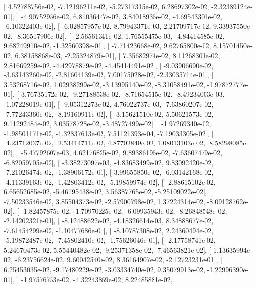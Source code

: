 \documentclass{article}
\begin{document}
       [  4.52788756e-02,  -7.12196211e-02,  -5.27317315e-02,
          6.28697302e-02,  -2.32389124e-01],
       [ -4.90752956e-02,   6.81036447e-02,   3.84018935e-02,
         -4.69543301e-02,  -6.10322403e-02],
       [ -6.02857957e-02,   8.79943371e-03,   2.21709717e-02,
          9.33937550e-02,  -8.36517906e-02],
       [ -2.56561341e-02,   1.76555475e-03,  -4.84414585e-02,
          9.68249910e-02,  -1.32560398e-01],
       [ -7.71423668e-02,   9.62765800e-02,   8.15701450e-02,
          6.38158868e-03,  -2.25324879e-01],
       [  7.35682974e-02,   8.11268301e-02,   2.81669259e-02,
         -4.42978879e-02,  -4.45414491e-02],
       [ -9.03906690e-02,  -3.63143260e-02,  -2.81604139e-02,
          7.00175028e-02,  -2.33035714e-01],
       [  3.53268716e-02,   1.02938299e-02,  -3.13995140e-02,
         -8.31058491e-02,  -1.97872777e-01],
       [  3.76735172e-02,  -9.27188538e-02,  -8.71654515e-02,
         -8.49234003e-03,  -1.07228019e-01],
       [ -9.05312273e-02,   4.76022737e-03,  -7.63860207e-02,
         -7.77243360e-02,  -8.19160911e-02],
       [ -3.15621510e-02,   5.50621573e-02,   9.11292484e-02,
          3.03578728e-02,  -3.48727499e-02],
       [ -1.97269340e-02,  -1.98501171e-02,  -1.32837613e-02,
          7.51121393e-04,  -7.19033305e-02],
       [ -4.23712037e-02,  -2.53414711e-02,   4.87702849e-02,
          1.08013103e-02,  -8.58298085e-02],
       [ -5.47792607e-03,   4.62176825e-02,   9.89386195e-02,
         -7.63607479e-02,  -6.82059705e-02],
       [ -3.38273097e-03,  -4.83683499e-02,   9.83092420e-02,
         -7.21026474e-02,  -1.38906172e-01],
       [  3.99655850e-02,  -6.03142168e-02,  -4.11339163e-02,
         -1.42803412e-02,  -5.19859974e-02],
       [ -2.88615102e-02,   6.65652685e-02,  -5.46195438e-02,
          3.56387765e-02,  -5.25109022e-02],
       [ -7.50233546e-02,   3.85504373e-02,  -2.57900798e-02,
          1.37224314e-02,  -8.09128762e-02],
       [ -1.82457875e-02,  -1.70970225e-02,  -6.09935943e-02,
         -8.26848548e-02,  -2.14202321e-01],
       [ -8.12488622e-02,  -4.18326614e-03,   8.34888677e-02,
         -7.61454299e-02,  -1.10477686e-01],
       [ -8.10787308e-02,   2.24360494e-02,  -5.19872487e-02,
         -7.45802410e-02,  -1.75626046e-01],
       [ -2.17758741e-02,   5.24670473e-02,   5.55440482e-02,
         -9.25371358e-02,  -7.46563821e-02],
       [  1.13635994e-02,  -6.23756624e-02,   9.60042540e-02,
          8.36164907e-02,  -2.12723231e-01],
       [  6.25453035e-02,  -9.17480229e-02,  -3.03334740e-02,
          9.35079913e-02,  -1.22996390e-01],
       [ -1.97576753e-02,  -4.32243869e-02,   8.22485881e-02,
\end{document}
